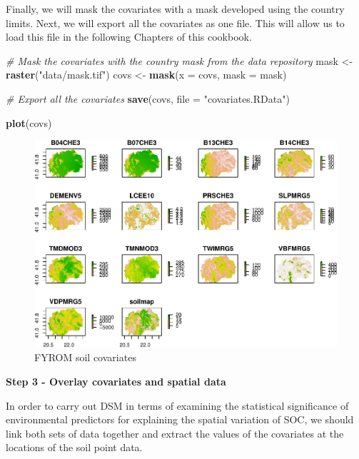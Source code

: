 \documentclass[10pt,b5paper,]{book}
\newenvironment{Shaded}{\begin{snugshade}}{\end{snugshade}}
\newcommand{\CommentTok}[1]{\textcolor[rgb]{0.56,0.35,0.01}{\textit{#1}}}
\newcommand{\DataTypeTok}[1]{\textcolor[rgb]{0.13,0.29,0.53}{#1}}
\newcommand{\KeywordTok}[1]{\textcolor[rgb]{0.13,0.29,0.53}{\textbf{#1}}}
\newcommand{\NormalTok}[1]{#1}
\newcommand{\StringTok}[1]{\textcolor[rgb]{0.31,0.60,0.02}{#1}}
\theoremstyle{definition}
\theoremstyle{definition}
\theoremstyle{definition}
\theoremstyle{remark}
\begin{document}
Finally, we will mask the covariates with a mask developed using the
country limits. Next, we will export all the covariates as one file.
This will allow us to load this file in the following Chapters of this
cookbook.

\begin{Shaded}
\begin{Highlighting}[]
\CommentTok{# Mask the covariates with the country mask from the data repository}
\NormalTok{mask <-}\StringTok{ }\KeywordTok{raster}\NormalTok{(}\StringTok{"data/mask.tif"}\NormalTok{)}
\NormalTok{covs <-}\StringTok{ }\KeywordTok{mask}\NormalTok{(}\DataTypeTok{x =}\NormalTok{ covs, }\DataTypeTok{mask =}\NormalTok{ mask)}

\CommentTok{# Export all the covariates }
\KeywordTok{save}\NormalTok{(covs, }\DataTypeTok{file =} \StringTok{"covariates.RData"}\NormalTok{)}

\KeywordTok{plot}\NormalTok{(covs)}
\end{Highlighting}
\end{Shaded}

\begin{figure}
\centering
\includegraphics{SOCMapping_files/figure-latex/unnamed-chunk-26-1.pdf}
\caption{\label{fig:unnamed-chunk-26}FYROM soil covariates}
\end{figure}

\textbf{Step 3 - Overlay covariates and spatial data}

In order to carry out DSM in terms of examining the statistical
significance of environmental predictors for explaining the spatial
variation of SOC, we should link both sets of data together and extract
the values of the covariates at the locations of the soil point data.
\end{document}
